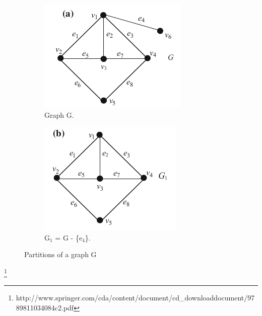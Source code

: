 \documentclass[11pt]{article}
\begin{document}
\begin{figure}[h!]
  \centering
  \begin{subfigure}[b]{0.4\linewidth}
    \includegraphics[width=\linewidth]{graph0.png}
    \caption{Graph G.}
  \end{subfigure} 
  \begin{subfigure}[b]{0.4\linewidth}
    \includegraphics[width=\linewidth]{graph1.png}
    \caption{$\mathrm{G_{1}}$ = G - \{$\mathrm{e_{4}}$\}.}
  \end{subfigure}
  \caption[Partitions]{Partitions of a graph G \footnotemark}
  \label{fig:coffee1}
\end{figure}\footnote{http://www.springer.com/cda/content/document/cd\_downloaddocument/9789811034084\-c2.pdf}
\end{document}
